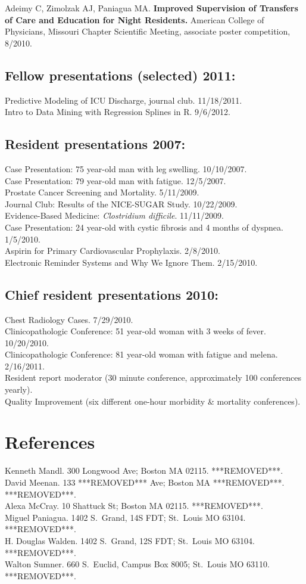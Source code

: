 \documentclass[12pt]{article}
\begin{document}
Adeimy C, Zimolzak AJ, Paniagua MA. \textbf{Improved Supervision of
  Transfers of Care and Education for Night Residents.} American
College of Physicians, Missouri Chapter Scientific Meeting, associate
poster competition, 8/2010.

\subsection*{Fellow presentations (selected) 2011:}
Predictive Modeling of ICU Discharge, journal club. 11/18/2011.\\
Intro to Data Mining with Regression Splines in R. 9/6/2012.

\subsection*{Resident presentations 2007:}
Case Presentation: 75 year-old man with leg swelling. 10/10/2007.\\
Case Presentation: 79 year-old man with fatigue. 12/5/2007.\\
Prostate Cancer Screening and Mortality. 5/11/2009.\\
Journal Club: Results of the NICE-SUGAR Study. 10/22/2009.\\
Evidence-Based Medicine: \emph{Clostridium difficile}. 11/11/2009.\\
Case Presentation: 24 year-old with cystic fibrosis and 4 months of
dyspnea. 1/5/2010.\\
Aspirin for Primary Cardiovascular Prophylaxis. 2/8/2010.\\
Electronic Reminder Systems and Why We Ignore Them. 2/15/2010.

\subsection*{Chief resident presentations 2010:}
Chest Radiology Cases. 7/29/2010.\\
Clinicopathologic Conference: 51 year-old woman with 3 weeks of fever.
10/20/2010.\\
Clinicopathologic Conference: 81 year-old woman with fatigue and
melena. 2/16/2011.\\
Resident report moderator (30 minute conference, approximately 100
conferences yearly).\\
Quality Improvement (six different one-hour morbidity \& mortality
conferences).

\section*{References}
Kenneth Mandl. 300 Longwood Ave; Boston MA 02115. ***REMOVED***.\\
David Meenan. 133 ***REMOVED*** Ave; Boston MA ***REMOVED***. ***REMOVED***.\\
Alexa McCray. 10 Shattuck St; Boston MA 02115. ***REMOVED***.\\
Miguel Paniagua. 1402 S.\ Grand, 14S FDT; St.\ Louis MO 63104.
***REMOVED***.\\
H. Douglas Walden. 1402 S.\ Grand, 12S FDT; St.\ Louis MO 63104.
***REMOVED***.\\
Walton Sumner. 660 S.\ Euclid, Campus Box 8005; St.\ Louis MO 63110.
***REMOVED***.
\end{document}
